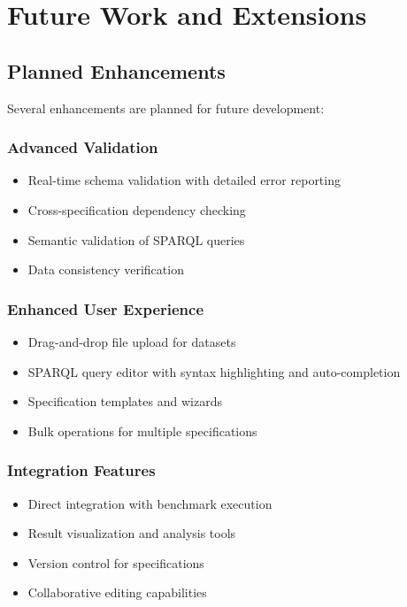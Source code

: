 \documentclass[11pt,a4paper]{article}
\begin{document}
\section{Future Work and Extensions}

\subsection{Planned Enhancements}

Several enhancements are planned for future development:

\subsubsection{Advanced Validation}
\begin{itemize}
    \item Real-time schema validation with detailed error reporting
    \item Cross-specification dependency checking
    \item Semantic validation of SPARQL queries
    \item Data consistency verification
\end{itemize}

\subsubsection{Enhanced User Experience}
\begin{itemize}
    \item Drag-and-drop file upload for datasets
    \item SPARQL query editor with syntax highlighting and auto-completion
    \item Specification templates and wizards
    \item Bulk operations for multiple specifications
\end{itemize}

\subsubsection{Integration Features}
\begin{itemize}
    \item Direct integration with benchmark execution
    \item Result visualization and analysis tools
    \item Version control for specifications
    \item Collaborative editing capabilities
\end{itemize}
\end{document}
